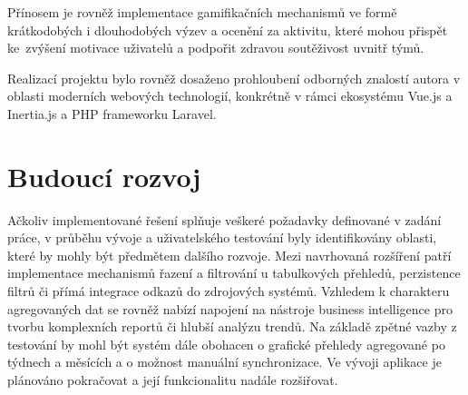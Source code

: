 Přínosem je rovněž implementace gamifikačních mechanismů ve formě krátkodobých i dlouhodobých výzev a ocenění za aktivitu, které mohou přispět ke~zvýšení motivace uživatelů a podpořit zdravou soutěživost uvnitř týmů.

Realizací projektu bylo rovněž dosaženo prohloubení odborných znalostí autora v oblasti moderních webových technologií, konkrétně v rámci ekosystému Vue.js a Inertia.js a PHP frameworku Laravel.

\section{Budoucí rozvoj}
Ačkoliv implementované řešení splňuje veškeré požadavky definované v zadání práce, v průběhu vývoje a uživatelského testování byly identifikovány oblasti, které by mohly být předmětem dalšího rozvoje. Mezi navrhovaná rozšíření patří implementace mechanismů řazení a filtrování u tabulkových přehledů, perzistence filtrů či přímá integrace odkazů do zdrojových systémů. Vzhledem k charakteru agregovaných dat se rovněž nabízí napojení na nástroje business intelligence pro tvorbu komplexních reportů či hlubší analýzu trendů. Na základě zpětné vazby z testování by mohl být systém dále obohacen o grafické přehledy agregované po týdnech a měsících a o možnost manuální synchronizace. Ve vývoji aplikace je plánováno pokračovat a její funkcionalitu nadále rozšiřovat.
